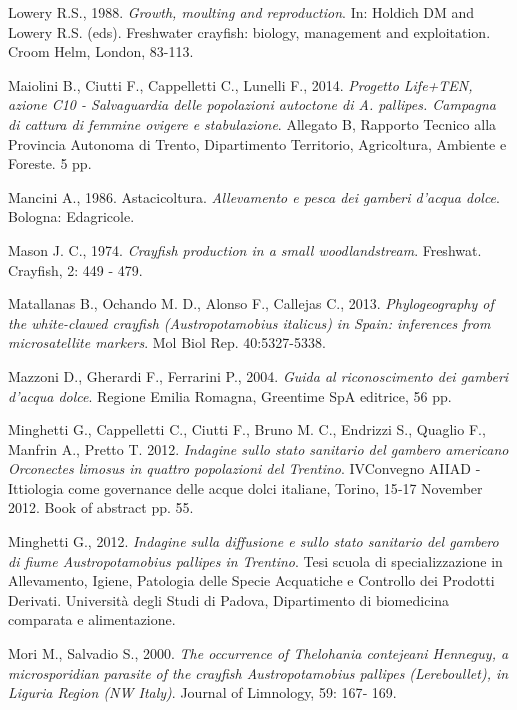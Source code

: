 \documentclass[11pt,a4paper,italian,twoside,openany]{memoir}
\begin{document}
\begin{thebibliography}{9}
 Lowery R.S., 1988. \emph{Growth, moulting and reproduction}. In: Holdich DM and Lowery R.S. (eds). Freshwater crayfish: biology, management and exploitation. Croom Helm, London, 83-113.

 Maiolini B., Ciutti F., Cappelletti C., Lunelli F., 2014. \emph{Progetto Life+TEN, azione C10 - Salvaguardia delle popolazioni autoctone di A. pallipes. Campagna di cattura di femmine ovigere e stabulazione}. Allegato B, Rapporto Tecnico alla Provincia Autonoma di Trento, Dipartimento Territorio, Agricoltura, Ambiente e Foreste. 5 pp.

 Mancini A., 1986. Astacicoltura. \emph{Allevamento e pesca dei gamberi d'acqua dolce}. Bologna: Edagricole.

 Mason J. C., 1974. \emph{Crayfish production in a small woodlandstream}. Freshwat. Crayfish, 2: 449 - 479.

 Matallanas B., Ochando M. D., Alonso F., Callejas C., 2013. \emph{Phylogeography of the white-clawed crayfish (Austropotamobius italicus) in Spain: inferences from microsatellite markers}. Mol Biol Rep. 40:5327-5338.

 Mazzoni D., Gherardi F., Ferrarini P., 2004. \emph{Guida al riconoscimento dei gamberi d'acqua dolce}. Regione Emilia Romagna, Greentime SpA editrice, 56 pp.

 Minghetti G., Cappelletti C., Ciutti F., Bruno M. C., Endrizzi S., Quaglio F., Manfrin A., Pretto T. 2012. \emph{Indagine sullo stato sanitario del gambero americano Orconectes limosus in quattro popolazioni del Trentino}. IVConvegno AIIAD -Ittiologia come governance delle acque dolci italiane, Torino, 15‐17 November 2012. Book of abstract pp. 55.

 Minghetti G., 2012. \emph{Indagine sulla diffusione e sullo stato sanitario del gambero di fiume Austropotamobius pallipes in Trentino}. Tesi scuola di specializzazione in Allevamento, Igiene, Patologia delle Specie Acquatiche e Controllo dei Prodotti Derivati. Università degli Studi di Padova, Dipartimento di biomedicina comparata e alimentazione. 

 Mori M., Salvadio S., 2000. \emph{The occurrence of Thelohania contejeani Henneguy, a microsporidian parasite of the crayfish Austropotamobius pallipes (Lereboullet), in Liguria Region (NW Italy)}. Journal of Limnology, 59: 167‐ 169.


\end{thebibliography}
\end{document}
